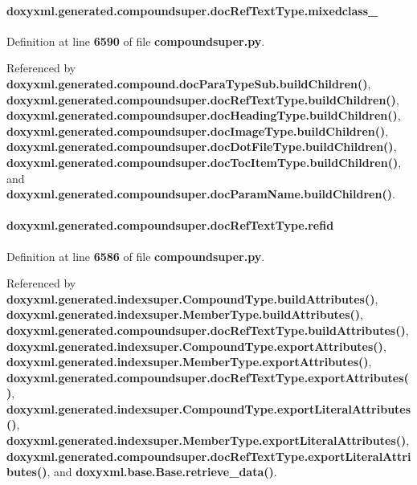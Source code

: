 \paragraph[{mixedclass\+\_\+}]{\setlength{\rightskip}{0pt plus 5cm}doxyxml.\+generated.\+compoundsuper.\+doc\+Ref\+Text\+Type.\+mixedclass\+\_\+}\label{classdoxyxml_1_1generated_1_1compoundsuper_1_1docRefTextType_ae84fd8ba4014f6979db46f03de8565bb}


Definition at line {\bf 6590} of file {\bf compoundsuper.\+py}.



Referenced by {\bf doxyxml.\+generated.\+compound.\+doc\+Para\+Type\+Sub.\+build\+Children()}, {\bf doxyxml.\+generated.\+compoundsuper.\+doc\+Ref\+Text\+Type.\+build\+Children()}, {\bf doxyxml.\+generated.\+compoundsuper.\+doc\+Heading\+Type.\+build\+Children()}, {\bf doxyxml.\+generated.\+compoundsuper.\+doc\+Image\+Type.\+build\+Children()}, {\bf doxyxml.\+generated.\+compoundsuper.\+doc\+Dot\+File\+Type.\+build\+Children()}, {\bf doxyxml.\+generated.\+compoundsuper.\+doc\+Toc\+Item\+Type.\+build\+Children()}, and {\bf doxyxml.\+generated.\+compoundsuper.\+doc\+Param\+Name.\+build\+Children()}.

\paragraph[{refid}]{\setlength{\rightskip}{0pt plus 5cm}doxyxml.\+generated.\+compoundsuper.\+doc\+Ref\+Text\+Type.\+refid}\label{classdoxyxml_1_1generated_1_1compoundsuper_1_1docRefTextType_a72f8e051a38dd524dd2257244a3a01cd}


Definition at line {\bf 6586} of file {\bf compoundsuper.\+py}.



Referenced by {\bf doxyxml.\+generated.\+indexsuper.\+Compound\+Type.\+build\+Attributes()}, {\bf doxyxml.\+generated.\+indexsuper.\+Member\+Type.\+build\+Attributes()}, {\bf doxyxml.\+generated.\+compoundsuper.\+doc\+Ref\+Text\+Type.\+build\+Attributes()}, {\bf doxyxml.\+generated.\+indexsuper.\+Compound\+Type.\+export\+Attributes()}, {\bf doxyxml.\+generated.\+indexsuper.\+Member\+Type.\+export\+Attributes()}, {\bf doxyxml.\+generated.\+compoundsuper.\+doc\+Ref\+Text\+Type.\+export\+Attributes()}, {\bf doxyxml.\+generated.\+indexsuper.\+Compound\+Type.\+export\+Literal\+Attributes()}, {\bf doxyxml.\+generated.\+indexsuper.\+Member\+Type.\+export\+Literal\+Attributes()}, {\bf doxyxml.\+generated.\+compoundsuper.\+doc\+Ref\+Text\+Type.\+export\+Literal\+Attributes()}, and {\bf doxyxml.\+base.\+Base.\+retrieve\+\_\+data()}.

